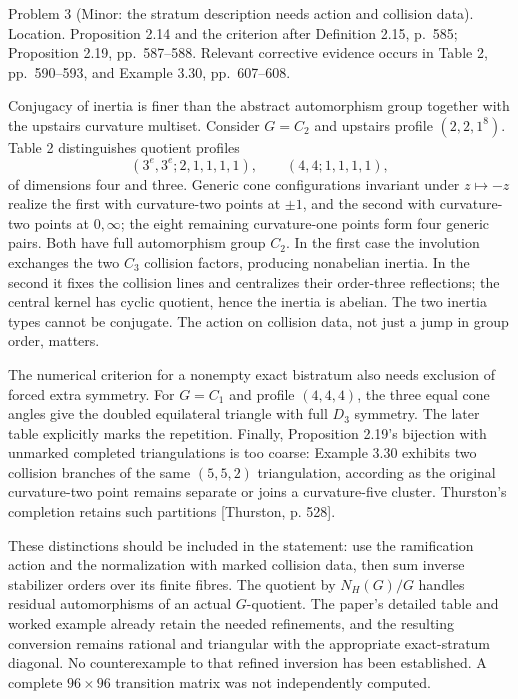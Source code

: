 \documentclass[10pt]{article}
\begin{document}
Problem 3 (Minor: the stratum description needs action and collision data).  Location. Proposition 2.14 and the criterion after Definition 2.15, p. 585; Proposition 2.19, pp. 587–588. Relevant corrective evidence occurs in Table 2, pp. 590–593, and Example 3.30, pp. 607–608.\par
Conjugacy of inertia is finer than the abstract automorphism group together with the upstairs curvature multiset. Consider \(G=C_2\) and upstairs profile \((2,2,1^8)\). Table 2 distinguishes quotient profiles \[(3^e,3^e;2,1,1,1,1),\qquad (4,4;1,1,1,1),\] of dimensions four and three. Generic cone configurations invariant under \(z\mapsto-z\) realize the first with curvature-two points at \(\pm1\), and the second with curvature-two points at \(0,\infty\); the eight remaining curvature-one points form four generic pairs. Both have full automorphism group \(C_2\). In the first case the involution exchanges the two \(C_3\) collision factors, producing nonabelian inertia. In the second it fixes the collision lines and centralizes their order-three reflections; the central kernel has cyclic quotient, hence the inertia is abelian. The two inertia types cannot be conjugate. The action on collision data, not just a jump in group order, matters.\par
The numerical criterion for a nonempty exact bistratum also needs exclusion of forced extra symmetry. For \(G=C_1\) and profile \((4,4,4)\), the three equal cone angles give the doubled equilateral triangle with full \(D_3\) symmetry. The later table explicitly marks the repetition. Finally, Proposition 2.19’s bijection with unmarked completed triangulations is too coarse: Example 3.30 exhibits two collision branches of the same \((5,5,2)\) triangulation, according as the original curvature-two point remains separate or joins a curvature-five cluster. Thurston’s completion retains such partitions [Thurston, p. 528].\par
These distinctions should be included in the statement: use the ramification action and the normalization with marked collision data, then sum inverse stabilizer orders over its finite fibres. The quotient by \(N_H(G)/G\) handles residual automorphisms of an actual \(G\)-quotient. The paper’s detailed table and worked example already retain the needed refinements, and the resulting conversion remains rational and triangular with the appropriate exact-stratum diagonal. No counterexample to that refined inversion has been established. A complete \(96\times96\) transition matrix was not independently computed.\par
\end{document}
